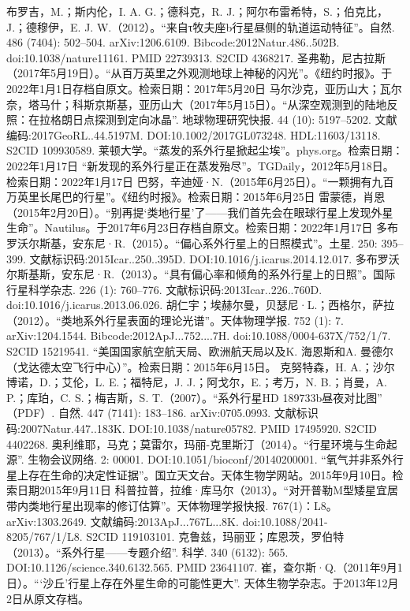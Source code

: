 \begin{enumerate}
 布罗吉，M.；斯内伦，I. A. G.；德科克，R. J.；阿尔布雷希特，S.；伯克比，J.；德穆伊，E. J. W.（2012）。“来自τ牧夫座b行星昼侧的轨道运动特征”。自然. 486 (7404): 502–504. arXiv:1206.6109. Bibcode:2012Natur.486..502B. doi:10.1038/nature11161. PMID 22739313. S2CID 4368217.
 圣弗勒，尼古拉斯（2017年5月19日）。“从百万英里之外观测地球上神秘的闪光”。《纽约时报》。于2022年1月1日存档自原文。检索日期：2017年5月20日
 马尔沙克，亚历山大；瓦尔奈，塔马什；科斯京斯基，亚历山大（2017年5月15日）。“从深空观测到的陆地反照：在拉格朗日点探测到定向冰晶”. 地球物理研究快报. 44 (10): 5197–5202. 文献编码:2017GeoRL..44.5197M. DOI:10.1002/2017GL073248. HDL:11603/13118. S2CID 109930589.
 莱顿大学。“蒸发的系外行星掀起尘埃”。phys.org。检索日期：2022年1月17日
 “新发现的系外行星正在蒸发殆尽”。TGDaily，2012年5月18日。检索日期：2022年1月17日
 巴努，辛迪娅·N.（2015年6月25日）。“一颗拥有九百万英里长尾巴的行星”。《纽约时报》。检索日期：2015年6月25日
 雷蒙德，肖恩（2015年2月20日）。“别再提‘类地行星’了——我们首先会在眼球行星上发现外星生命”。Nautilus。于2017年6月23日存档自原文。检索日期：2022年1月17日
 多布罗沃尔斯基，安东尼·R.（2015）。“偏心系外行星上的日照模式”。土星. 250: 395–399. 文献标识码:2015Icar..250..395D. DOI:10.1016/j.icarus.2014.12.017.
 多布罗沃尔斯基斯，安东尼·R.（2013）。“具有偏心率和倾角的系外行星上的日照”。国际行星科学杂志. 226 (1): 760–776. 文献标识码:2013Icar..226..760D. doi:10.1016/j.icarus.2013.06.026.
 胡仁宇；埃赫尔曼，贝瑟尼·L.；西格尔，萨拉（2012）。“类地系外行星表面的理论光谱”。天体物理学报. 752 (1): 7. arXiv:1204.1544. Bibcode:2012ApJ...752....7H. doi:10.1088/0004-637X/752/1/7. S2CID 15219541.
 “美国国家航空航天局、欧洲航天局以及K. 海恩斯和A. 曼德尔（戈达德太空飞行中心）”。检索日期：2015年6月15日。
 克努特森，H. A.；沙尔博诺，D.；艾伦，L. E.；福特尼，J. J.；阿戈尔，E.；考万，N. B.；肖曼，A. P.；库珀，C. S.；梅吉斯，S. T.（2007）。“系外行星HD 189733b昼夜对比图” （PDF）. 自然. 447 (7141): 183–186. arXiv:0705.0993. 文献标识码:2007Natur.447..183K. DOI:10.1038/nature05782. PMID 17495920. S2CID 4402268.
 奥利维耶，马克；莫雷尔，玛丽-克里斯汀（2014）。“行星环境与生命起源”. 生物会议网络. 2: 00001. DOI:10.1051/bioconf/20140200001.
 “氧气并非系外行星上存在生命的决定性证据”。国立天文台。天体生物学网站。2015年9月10日。检索日期2015年9月11日
 科普拉普，拉维·库马尔（2013）。“对开普勒M型矮星宜居带内类地行星出现率的修订估算”。天体物理学报快报. 767(1)：L8。arXiv:1303.2649. 文献编码:2013ApJ...767L...8K. doi:10.1088/2041-8205/767/1/L8. S2CID 119103101.
 克鲁兹，玛丽亚；库恩茨，罗伯特（2013）。“系外行星——专题介绍”. 科学. 340 (6132): 565. DOI:10.1126/science.340.6132.565. PMID 23641107.
 崔，查尔斯·Q.（2011年9月1日）。“‘沙丘’行星上存在外星生命的可能性更大”. 天体生物学杂志。于2013年12月2日从原文存档。

\end{enumerate}
